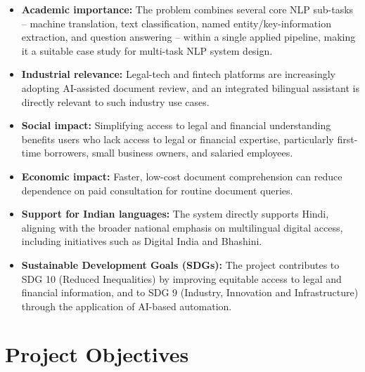 \begin{itemize}
    \item \textbf{Academic importance:} The problem combines several core NLP sub-tasks -- machine translation, text classification, named entity/key-information extraction, and question answering -- within a single applied pipeline, making it a suitable case study for multi-task NLP system design.
    \item \textbf{Industrial relevance:} Legal-tech and fintech platforms are increasingly adopting AI-assisted document review, and an integrated bilingual assistant is directly relevant to such industry use cases.
    \item \textbf{Social impact:} Simplifying access to legal and financial understanding benefits users who lack access to legal or financial expertise, particularly first-time borrowers, small business owners, and salaried employees.
    \item \textbf{Economic impact:} Faster, low-cost document comprehension can reduce dependence on paid consultation for routine document queries.
    \item \textbf{Support for Indian languages:} The system directly supports Hindi, aligning with the broader national emphasis on multilingual digital access, including initiatives such as Digital India and Bhashini.
    \item \textbf{Sustainable Development Goals (SDGs):} The project contributes to SDG 10 (Reduced Inequalities) by improving equitable access to legal and financial information, and to SDG 9 (Industry, Innovation and Infrastructure) through the application of AI-based automation.
\end{itemize}


\section{Project Objectives}

